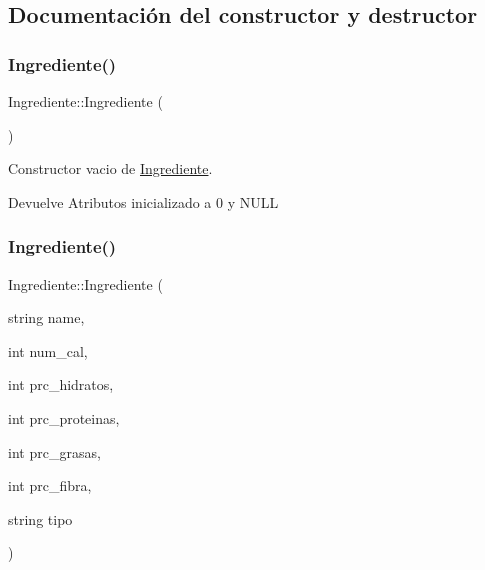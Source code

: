 \subsection{Documentación del constructor y destructor}
\mbox{\label{classIngrediente_ac39e59564451be4c0e12af8ce3d40afb}} 
\subsubsection{\texorpdfstring{Ingrediente()}{Ingrediente()}\hspace{0.1cm}{\footnotesize\ttfamily [1/3]}}
{\footnotesize\ttfamily Ingrediente\+::\+Ingrediente (\begin{DoxyParamCaption}{ }\end{DoxyParamCaption})}



Constructor vacio de \hyperlink{classIngrediente}{Ingrediente}. 

\begin{DoxyReturn}{Devuelve}
Atributos inicializado a 0 y N\+U\+LL 
\end{DoxyReturn}
\mbox{\label{classIngrediente_ada434a334ca0001f26e32abdd69a3a48}} 
\subsubsection{\texorpdfstring{Ingrediente()}{Ingrediente()}\hspace{0.1cm}{\footnotesize\ttfamily [2/3]}}
{\footnotesize\ttfamily Ingrediente\+::\+Ingrediente (\begin{DoxyParamCaption}\item[{string}]{name,  }\item[{int}]{num\+\_\+cal,  }\item[{int}]{prc\+\_\+hidratos,  }\item[{int}]{prc\+\_\+proteinas,  }\item[{int}]{prc\+\_\+grasas,  }\item[{int}]{prc\+\_\+fibra,  }\item[{string}]{tipo }\end{DoxyParamCaption})}




